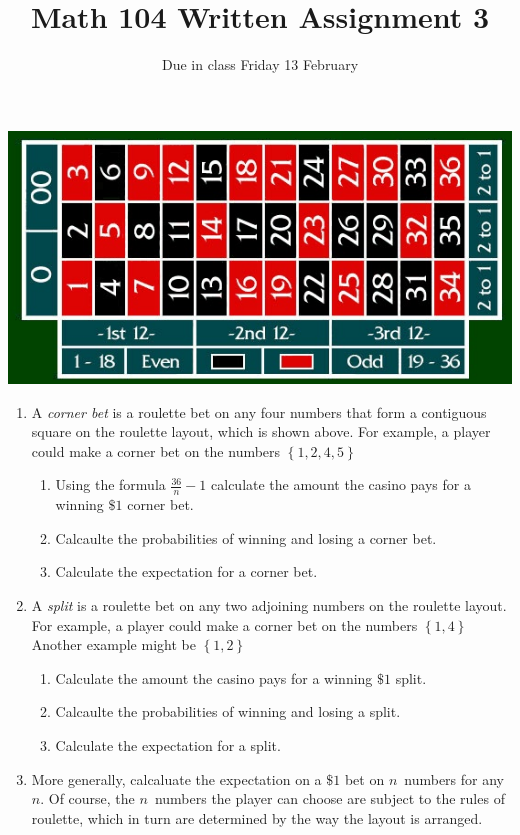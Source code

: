 \documentclass[12pt]{article}
\author{}\date{Due in class Friday 13 February}
\title{Math 104 Written Assignment 3}\author{}
\begin{document}
\maketitle
\pagestyle{empty}

\begin{center}\includegraphics[scale=.3]{RouletteLayout}\end{center}
\begin{enumerate}
\item A {\em corner bet} is a roulette bet on any four numbers that form
a contiguous square on the roulette layout, which is shown above.
For example, a player could make a corner bet on the numbers
$\left\{1,2,4,5\right\}$
\begin{enumerate}
\item Using the formula $\frac{36}{n}-1$ calculate the amount
the casino pays for a winning $\$1$ corner bet.
\item Calcaulte the probabilities of winning and losing a corner bet.
\item Calculate the expectation for a corner bet.
\end{enumerate}

\item A {\em split} is a roulette bet on any two adjoining numbers
on the roulette layout.
For example, a player could make a corner bet on the numbers
$\left\{1,4\right\}$
Another example might be $\left\{1,2\right\}$
\begin{enumerate}
\item Calculate the amount the casino pays for a winning $\$1$ split.
\item Calcaulte the probabilities of winning and losing a split.
\item Calculate the expectation for a split.
\end{enumerate}

\item More generally, calcaluate the expectation on a $\$1$ bet on
$n$~numbers for any $n$. Of course, the $n$~numbers the player can
choose are subject to the rules of roulette, which in turn are determined
by the way the layout is arranged.

\end{enumerate}
\end{document}
